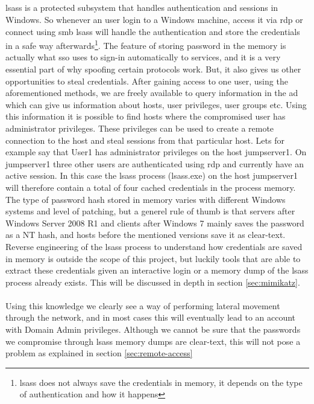 \documentclass{article}
\begin{document}
\subsection{}
\label{sec:lsass}
\gls{lsass} is a protected subsystem that handles authentication and sessions in Windows. So whenever an user login to a Windows machine, access it via \gls{rdp} or connect using \gls{smb} \gls{lsass} will handle the authentication and store the credentials in a safe way afterwards\footnote{\gls{lsass} does not always save the credentials in memory, it depends on the type of authentication and how it happens\cite{url:lsass:cred-in-memory}}.
The feature of storing password in the memory is actually what \gls{sso} uses to sign-in automatically to services, and it is a very essential part of why spoofing certain protocols work. But, it also gives us other opportunities to steal credentials. After gaining access to one user, using the aforementioned methods, we are freely available to query information in the \gls{ad} which can give us information about hosts, user privileges, user groups etc. Using this information it is possible to find hosts where the compromised user has administrator privileges. These privileges can be used to create a remote connection to the host and steal sessions from that particular host. Lets for example say that User1 has administrator privileges on the host jumpserver1. On jumpserver1 three other users are authenticated using \gls{rdp} and currently have an active session. In this case the \gls{lsass} process (lsass.exe) on the host jumpserver1 will therefore contain a total of four cached credentials in the process memory. The type of password hash stored in memory varies with different Windows systems and level of patching, but a generel rule of thumb is that servers after Windows Server 2008 R1 and clients after Windows 7 mainly saves the password as a NT hash, and hosts before the mentioned versions save it as clear-text\cite{url:lsass:clear-text-2008}.\\
Reverse engineering of the \gls{lsass} process to understand how credentials are saved in memory is outside the scope of this project, but luckily tools that are able to extract these credentials given an interactive login or a memory dump of the \gls{lsass} process already exists. This will be discussed in depth in section \ref{sec:mimikatz}.
\\\\
Using this knowledge we clearly see a way of performing lateral movement through the network, and in most cases this will eventually lead to an account with Domain Admin privileges. Although we cannot be sure that the passwords we compromise through \gls{lsass} memory dumps are clear-text, this will not pose a problem as explained in section \ref{sec:remote-access}
\end{document}
